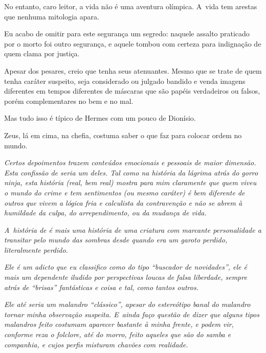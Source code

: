 \asterisc{}

No entanto, caro leitor, a vida não é uma aventura olímpica. A~vida tem
arestas que nenhuma mitologia apara.

Eu acabo de omitir para este segurança um segredo: naquele assalto
praticado por  o morto foi outro segurança, e aquele tombou com
certeza para indignação de quem clama por justiça.

Apesar dos pesares, creio que  tenha seus atenuantes. Mesmo que se
trate de quem tenha caráter suspeito, seja considerado ou julgado
bandido e venda imagens diferentes em tempos diferentes de máscaras que
são papéis verdadeiros ou falsos, porém complementares no bem e no mal.

Mas tudo isso é típico de Hermes com um pouco de Dionísio.

Zeus, lá em cima, na chefia, costuma saber o que faz para colocar ordem
no mundo.

\begin{center}\asterisc{}\end{center}
\begingroup\small

\emph{Certos depoimentos trazem conteúdos emocionais e pessoais de maior
dimensão. Esta confissão de  seria um deles. Tal como na história da
lágrima atrás do gorro ninja, esta história (real, bem real) mostra para
mim claramente que quem viveu o mundo do crime e tem sentimentos (ou
mesmo caráter) é bem diferente de outros que vivem a lógica fria e
calculista da contravenção e não se abrem à humildade da culpa, do
arrependimento, ou da mudança de vida.}~

\emph{A~história de  é mais uma história de uma criatura com marcante
personalidade a transitar pelo mundo das sombras desde quando era um
garoto perdido, literalmente perdido.}~

\emph{Ele é um adicto que eu classifico como do tipo ``buscador de
novidades'', ele é mais um dependente iludido por perspectivas loucas de
falsa liberdade, sempre atrás de ``brisas'' fantásticas e coisa e tal,
como tantos outros.}~

\emph{Ele até seria um malandro ``clássico'', apesar do estereótipo
banal do malandro tornar minha observação suspeita. E~ainda faço questão
de dizer que alguns tipos malandros feito  costumam aparecer bastante
à minha frente, e podem vir, conforme reza o folclore, até do morro,
feito aqueles que são do samba e companhia, e cujos perfis misturam
chavões com realidade.}~


